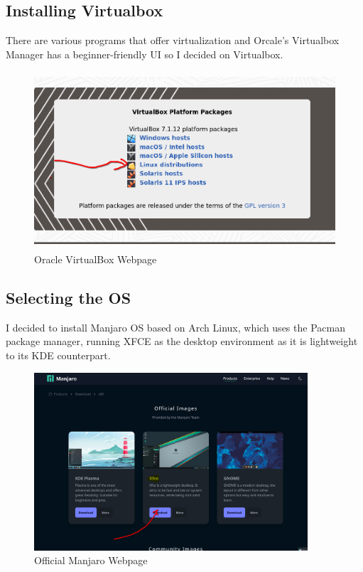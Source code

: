 \documentclass[a4paper,12pt]{report}
\begin{document}
\subsection{Installing Virtualbox}
There are various programs that offer virtualization and Orcale's Virtualbox Manager has a beginner-friendly UI so I decided on Virtualbox.
\begin{figure}[h]
    \centering
    \includegraphics[height=250px]{virtualbox.png}
    \caption{Oracle VirtualBox Webpage}
\end{figure}
\subsection{Selecting the OS}
I decided to install Manjaro OS based on Arch Linux, which uses the Pacman package manager, running XFCE as the desktop environment as it is lightweight to its KDE counterpart.

\begin{figure}[h]
    \centering
    \includegraphics[height=250px]{./manjaro.png}
    \caption{Official Manjaro Webpage }
\end{figure}
\newpage
\end{document}

